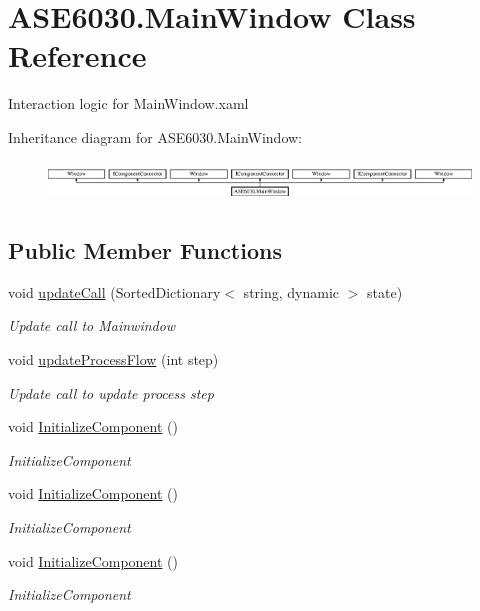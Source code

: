 \hypertarget{class_a_s_e6030_1_1_main_window}{}\section{A\+S\+E6030.\+Main\+Window Class Reference}
\label{class_a_s_e6030_1_1_main_window}


Interaction logic for Main\+Window.\+xaml  


Inheritance diagram for A\+S\+E6030.\+Main\+Window\+:\begin{figure}[H]
\begin{center}
\leavevmode
\includegraphics[height=1.073825cm]{class_a_s_e6030_1_1_main_window}
\end{center}
\end{figure}
\subsection*{Public Member Functions}
\begin{DoxyCompactItemize}
\item 
void \hyperlink{class_a_s_e6030_1_1_main_window_adeaea371e5e8ae0d36da0488e3f573a9}{update\+Call} (Sorted\+Dictionary$<$ string, dynamic $>$ state)
\begin{DoxyCompactList}\small\item\em Update call to Mainwindow \end{DoxyCompactList}\item 
void \hyperlink{class_a_s_e6030_1_1_main_window_a79b6db853cf517f0df08f041b207e7e6}{update\+Process\+Flow} (int step)
\begin{DoxyCompactList}\small\item\em Update call to update process step \end{DoxyCompactList}\item 
void \hyperlink{class_a_s_e6030_1_1_main_window_ae87e50858240332fce20264ac23638e8}{Initialize\+Component} ()
\begin{DoxyCompactList}\small\item\em Initialize\+Component \end{DoxyCompactList}\item 
void \hyperlink{class_a_s_e6030_1_1_main_window_ae87e50858240332fce20264ac23638e8}{Initialize\+Component} ()
\begin{DoxyCompactList}\small\item\em Initialize\+Component \end{DoxyCompactList}\item 
void \hyperlink{class_a_s_e6030_1_1_main_window_ae87e50858240332fce20264ac23638e8}{Initialize\+Component} ()
\begin{DoxyCompactList}\small\item\em Initialize\+Component \end{DoxyCompactList}\end{DoxyCompactItemize}


